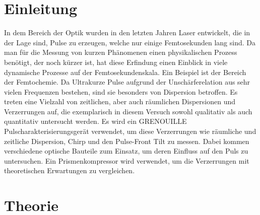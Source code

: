 \documentclass[twoside,        %
               BCOR12mm,       %
               english,ngerman, %
               fleqn,headsepline=false,footsepline=false
              ]{Vorlage/MFPREPORT}
\begin{document}
\date{\today}
\CopyNotWanted

\maketitle


\tableofcontents

\clearpage
{}

\section{Einleitung}
\label{sec:einleitung}
In dem Bereich der Optik wurden in den letzten Jahren Laser entwickelt, die in
der Lage sind, Pulse zu erzeugen, welche nur einige Femtosekunden lang sind. Da
man für die Messung von kurzen Phänomenen einen physikalischen Prozess
benötigt, der noch kürzer ist, hat diese Erfindung einen Einblick in viele
dynamische Prozesse auf der Femtosekundenskala. Ein Beispiel ist der Bereich
der Femtochemie.
Da Ultrakurze Pulse aufgrund der Unschärferelation aus sehr vielen Frequenzen
bestehen, sind sie besonders von Dispersion betroffen. Es treten eine Vielzahl
von zeitlichen, aber auch räumlichen Dispersionen und Verzerrungen auf, die
exemplarisch in diesem Versuch sowohl qualitativ als auch quantitativ
untersucht werden. 
Es wird ein GRENOUILLE Pulscharakterisierungsgerät verwendet, um diese
Verzerrungen wie räumliche und zeitliche Dispersion, Chirp und den Pulse-Front
Tilt zu messen. Dabei kommen verschiedene optische Bauteile zum Einsatz, um
deren Einfluss auf den Puls zu untersuchen. Ein Prismenkompressor wird
verwendet, um die Verzerrungen mit theoretischen Erwartungen zu vergleichen.
\section{Theorie}
\label{sec:theorie}
\end{document}
